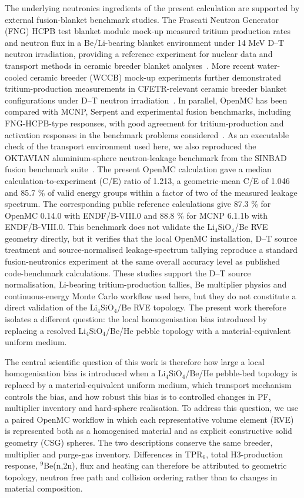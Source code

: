 \documentclass[preprint,12pt]{elsarticle}
\begin{document}
The underlying neutronics ingredients of the present calculation are supported
by external fusion-blanket benchmark studies.  The Frascati Neutron Generator
(FNG) HCPB test blanket module mock-up measured tritium production rates and
neutron flux in a Be/Li-bearing blanket environment under 14 MeV D--T neutron
irradiation, providing a reference experiment for nuclear data and transport
methods in ceramic breeder blanket analyses~\cite{batistoni2007}.  More recent
water-cooled ceramic breeder (WCCB) mock-up experiments further demonstrated
tritium-production measurements in CFETR-relevant ceramic breeder blanket
configurations under D--T neutron irradiation~\cite{zhu2021}.  In parallel,
OpenMC has been compared with MCNP, Serpent and experimental fusion benchmarks,
including FNG-HCPB-type responses, with good agreement for tritium-production
and activation responses in the benchmark problems considered~\cite{valentine2022}.
As an executable check of the transport environment used here, we also
reproduced the OKTAVIAN aluminium-sphere neutron-leakage benchmark from the
SINBAD fusion benchmark suite~\cite{kodeli2021,konno2010}.  The present OpenMC
calculation gave a median calculation-to-experiment (C/E) ratio of 1.213, a
geometric-mean C/E of 1.046 and 85.7 \% of valid energy groups within a factor
of two of the measured leakage spectrum.  The corresponding public reference
calculations give 87.3 \% for OpenMC 0.14.0 with ENDF/B-VIII.0 and 88.8 \% for
MCNP 6.1.1b with ENDF/B-VIII.0.  This benchmark does not validate the
Li$_4$SiO$_4$/Be RVE geometry directly, but it verifies that the local OpenMC
installation, D--T source treatment and source-normalised leakage-spectrum
tallying reproduce a standard fusion-neutronics experiment at the same overall
accuracy level as published code-benchmark calculations.
These studies support the D--T source normalisation, Li-bearing
tritium-production tallies, Be multiplier physics and continuous-energy Monte
Carlo workflow used here, but they do not constitute a direct validation of the
Li$_4$SiO$_4$/Be RVE topology.  The present work therefore isolates a different
question: the local homogenisation bias
introduced by replacing a resolved Li$_4$SiO$_4$/Be/He pebble topology with a
material-equivalent uniform medium.

The central scientific question of this work is therefore how large a local
homogenisation bias is introduced when a Li$_4$SiO$_4$/Be/He pebble-bed topology
is replaced by a material-equivalent uniform medium, which transport mechanism
controls the bias, and how robust this bias is to controlled changes in PF,
multiplier inventory and hard-sphere realisation.  To address this question, we
use a paired OpenMC workflow in which each representative volume element (RVE)
is represented both as a homogenised material and as explicit constructive solid
geometry (CSG) spheres.  The two descriptions conserve the same breeder,
multiplier and purge-gas inventory.  Differences in TPR$_6$, total
H3-production response, $^9$Be(n,2n), flux and heating can therefore be
attributed to geometric topology, neutron free path and collision ordering
rather than to changes in material composition.
\end{document}
